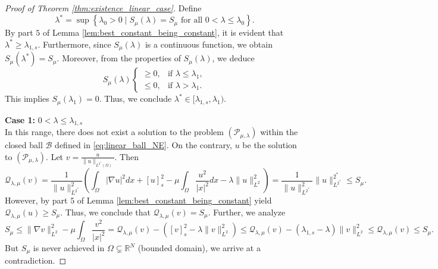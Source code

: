 \documentclass[11pt]{article}
\newcommand{\om} {\Omega}
\newcommand{\la} {\lambda}
\newcommand{\noi} {\noindent}
\newcommand{\grad}{\nabla}
\newcommand{\Q}{\mathcal{Q}_{\la,\mu}}
\begin{document}
\begin{proof}[Proof of Theorem \ref{thm:existence_linear_case}]
Define
\begin{equation*}
\lambda^* = \sup \left\{ \lambda_0 > 0 \mid S_{\mu}(\lambda) = S_{\mu} \mbox{ for all } 0 < \la \leq \la_0 \right\}.
\end{equation*}
By part $5$ of Lemma \ref{lem:best_constant_being_constant}, it is evident that $\lambda^* \geq \lambda_{1, s}$. Furthermore, since $S_{\mu}(\lambda)$ is a continuous function, we obtain $S_{\mu}(\lambda^*) = S_{\mu}$. Moreover, from the properties of $S_{\mu}(\lambda)$, we deduce
\begin{equation*}
S_{\mu}(\lambda) 
\begin{cases}
    \geq 0, & \text{if } \lambda \leq \lambda_1, \\
    \leq 0, & \text{if } \lambda > \lambda_1.
\end{cases}
\end{equation*}
This implies $S_{\mu}(\lambda_1) = 0$. Thus, we conclude $\lambda^* \in [\lambda_{1, s}, \lambda_1)$.

\noi \textbf{Case 1:} $0 < \lambda \leq \lambda_{1, s}$ \\
In this range, there does not exist a solution to the problem $( \mathcal{P}_{\mu,\la})$ within the closed ball $\mathcal{B}$ defined in \eqref{eq:linear_ball_NE}. On the contrary, $u$ be the solution to $( \mathcal{P}_{\mu,\la})$. Let $ v = \frac{u}{\| u \|_{L^{2^*}(\Omega)}}$. Then
\begin{equation*}
\Q(v)  = \frac{1}{\| u \|_{L^{2^*}}^2} \left( \int_{\om} |\grad u|^2 dx + [u]_s^2 - \mu \int_{\Omega} \frac{u^2}{|x|^2} dx - \lambda \| u \|_{L^2}^2 \right) = \frac{1}{\| u \|_{L^{2^*}}^2} \| u \|_{L^{2^*}}^{2^*}\leq S_{\mu}.
\end{equation*}
However, by part $5$ of Lemma \ref{lem:best_constant_being_constant} yield $\Q(u) \geq S_{\mu}.$ Thus, we conclude that $\Q(v) = S_{\mu}$. Further, we analyze
\begin{equation*}
S_{\mu}  \leq \| \nabla v \|_{L^2}^2 - \mu \int_{\Omega} \frac{v^2}{|x|^2} = \Q(v) - \left( [v]^2_{s} - \lambda \| v \|_{L^2}^{2} \right)\leq \Q(v)-\left( \lambda_{1,s} - \lambda \right) \| v \|_{L^2}^{2} \leq \Q(v) \leq S_{\mu}.
\end{equation*}
But $S_{\mu}$ is never achieved in $\Omega \subsetneq \mathbb{R}^N$ (bounded domain), we arrive at a contradiction.


\end{proof}
\end{document}
